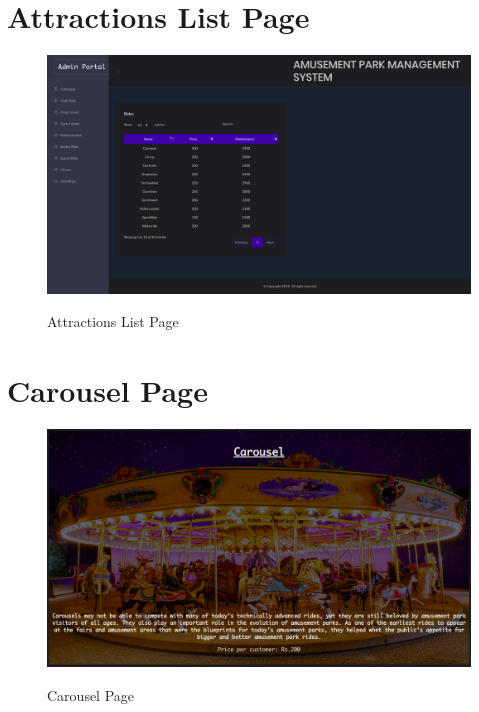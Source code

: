 \section{Attractions List Page}
\begin{figure}[H]
\centering
\caption{Attractions List Page}
\includegraphics[scale=.22]{./atr.png}
\\[0.2in]
\label{fig:Attractions List Page}
\end{figure}

\thispagestyle{fancy}


\section{Carousel Page}
\begin{figure}[H]
\centering
\caption{Carousel Page}
\includegraphics[scale=.22]{./car.png}
\\[0.2in]
\label{fig:Carousel Page}
\end{figure}

\thispagestyle{fancy}


